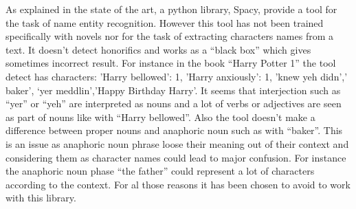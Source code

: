 \documentclass[a4paper, 12pt]{report}
\begin{document}
As explained in the state of the art, a  python library, Spacy, provide a tool for the task of name entity recognition. However this tool has not been trained specifically with novels nor for the task of extracting characters names from a text. It doesn't detect honorifics and works as a ``black box'' which gives sometimes incorrect result. For instance in the book ``Harry Potter 1'' the tool detect has characters: 'Harry bellowed': 1, 'Harry anxiously': 1, 'knew yeh didn',' baker', `yer meddlin','Happy Birthday Harry'. It seems that interjection such as ``yer'' or ``yeh'' are interpreted as nouns and  a lot of verbs or adjectives are seen as part of nouns like with ``Harry bellowed''. Also the tool doesn't make a difference between proper nouns and anaphoric noun such as with ``baker''. This is an issue as anaphoric noun phrase loose their meaning out of their context and considering them as character names could lead to major confusion. For instance the anaphoric noun phase ``the father'' could represent a lot of characters according to the context. For al those reasons it has been chosen to avoid to work with this library. \\
\end{document}
